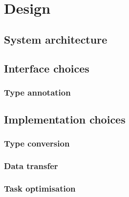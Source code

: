 \chapter{Design}

\section{System architecture}


\section{Interface choices}
\subsection{Type annotation}

\section{Implementation choices}
\subsection{Type conversion}

\subsection{Data transfer}

\subsection{Task optimisation}
